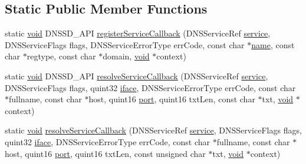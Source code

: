 \subsection*{Static Public Member Functions}
\begin{DoxyCompactItemize}
\item 
static \hyperlink{group___u_a_v_objects_plugin_ga444cf2ff3f0ecbe028adce838d373f5c}{void} D\-N\-S\-S\-D\-\_\-\-A\-P\-I \hyperlink{class_qxt_discoverable_service_private_ad5f5fabefa1d4df5f467586a1b5a2641}{register\-Service\-Callback} (D\-N\-S\-Service\-Ref \hyperlink{class_qxt_discoverable_service_private_a89f3ba9a5aad5e68434a2d4d050d2cfc}{service}, D\-N\-S\-Service\-Flags flags, D\-N\-S\-Service\-Error\-Type err\-Code, const char $\ast$\hyperlink{glext_8h_ad977737dfc9a274a62741b9500c49a32}{name}, const char $\ast$regtype, const char $\ast$domain, \hyperlink{group___u_a_v_objects_plugin_ga444cf2ff3f0ecbe028adce838d373f5c}{void} $\ast$context)
\item 
static \hyperlink{group___u_a_v_objects_plugin_ga444cf2ff3f0ecbe028adce838d373f5c}{void} D\-N\-S\-S\-D\-\_\-\-A\-P\-I \hyperlink{class_qxt_discoverable_service_private_a24ae3be5da1a3f7fb9864ef241faae3c}{resolve\-Service\-Callback} (D\-N\-S\-Service\-Ref \hyperlink{class_qxt_discoverable_service_private_a89f3ba9a5aad5e68434a2d4d050d2cfc}{service}, D\-N\-S\-Service\-Flags flags, quint32 \hyperlink{class_qxt_discoverable_service_private_a92e36c58936d8b75feaa535373760be5}{iface}, D\-N\-S\-Service\-Error\-Type err\-Code, const char $\ast$fullname, const char $\ast$host, quint16 \hyperlink{classport}{port}, quint16 txt\-Len, const char $\ast$txt, \hyperlink{group___u_a_v_objects_plugin_ga444cf2ff3f0ecbe028adce838d373f5c}{void} $\ast$context)
\item 
static \hyperlink{group___u_a_v_objects_plugin_ga444cf2ff3f0ecbe028adce838d373f5c}{void} \hyperlink{class_qxt_discoverable_service_private_a8b4b09303db0f964e5f09d68f7de776b}{resolve\-Service\-Callback} (D\-N\-S\-Service\-Ref \hyperlink{class_qxt_discoverable_service_private_a89f3ba9a5aad5e68434a2d4d050d2cfc}{service}, D\-N\-S\-Service\-Flags flags, quint32 \hyperlink{class_qxt_discoverable_service_private_a92e36c58936d8b75feaa535373760be5}{iface}, D\-N\-S\-Service\-Error\-Type err\-Code, const char $\ast$fullname, const char $\ast$host, quint16 \hyperlink{classport}{port}, quint16 txt\-Len, const unsigned char $\ast$txt, \hyperlink{group___u_a_v_objects_plugin_ga444cf2ff3f0ecbe028adce838d373f5c}{void} $\ast$context)
\end{DoxyCompactItemize}
